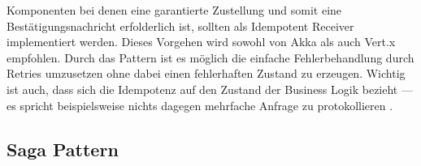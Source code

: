 Komponenten bei denen eine garantierte Zustellung und somit eine Bestätigungsnachricht erfolderlich ist, sollten als Idempotent Receiver implementiert werden. Dieses Vorgehen wird sowohl von Akka als auch Vert.x empfohlen. Durch das Pattern ist es möglich die einfache Fehlerbehandlung durch Retries umzusetzen ohne dabei einen fehlerhaften Zustand zu erzeugen. Wichtig ist auch, dass sich die Idempotenz auf den Zustand der Business Logik bezieht --- es spricht beispielsweise nichts dagegen mehrfache Anfrage zu protokollieren \cite[S.~216]{newman_building_2015}.

\pagebreak

\subsection{Saga Pattern}
